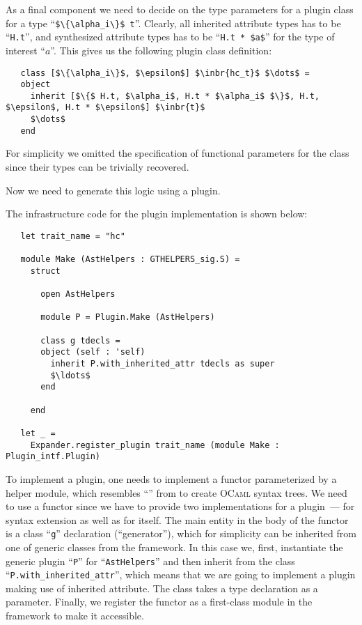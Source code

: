 As a final component we need to decide on the type parameters for a plugin class for a type ``\lstinline|$\{\alpha_i\}$ t|''. Clearly,
all inherited attribute types has to be ``\lstinline{H.t}'', and synthesized attribute types has to be ``\lstinline{H.t * $a$}'' for the
type of interest ``$a$''. This gives us the following plugin class definition:

\begin{lstlisting}
   class [$\{\alpha_i\}$, $\epsilon$] $\inbr{hc_t}$ $\dots$ =
   object
     inherit [$\{$ H.t, $\alpha_i$, H.t * $\alpha_i$ $\}$, H.t, $\epsilon$, H.t * $\epsilon$] $\inbr{t}$
     $\dots$
   end
\end{lstlisting}

For simplicity we omitted the specification of functional parameters for the class since their types can be trivially
recovered.

Now we need to generate this logic using a plugin.

The infrastructure code for the plugin implementation is shown below:

\begin{lstlisting}
   let trait_name = "hc"
  
   module Make (AstHelpers : GTHELPERS_sig.S) =
     struct
     
       open AstHelpers

       module P = Plugin.Make (AstHelpers)

       class g tdecls =
       object (self : 'self)
         inherit P.with_inherited_attr tdecls as super
         $\ldots$
       end

     end

   let _ =
     Expander.register_plugin trait_name (module Make : Plugin_intf.Plugin)
\end{lstlisting}

To implement a plugin, one needs to implement a functor parameterized by a helper module, which resembles ``'' from
 to create \textsc{OCaml} syntax trees. We need to use a functor since we have to provide two implementations for
a plugin~--- for  syntax extension as well as for  itself. The main entity in the body of the functor is
a class ``\lstinline{g}'' declaration (``generator''), which for simplicity can be inherited from one of generic classes 
from the framework. In this case we, first, instantiate the generic plugin ``\lstinline{P}'' for ``\lstinline{AstHelpers}'' and
then inherit from the class ``\lstinline{P.with_inherited_attr}'', which means that we are going to implement a plugin
making use of inherited attribute. The class takes a type declaration as a parameter. Finally, we register the functor as a
first-class module in the framework to make it accessible.

